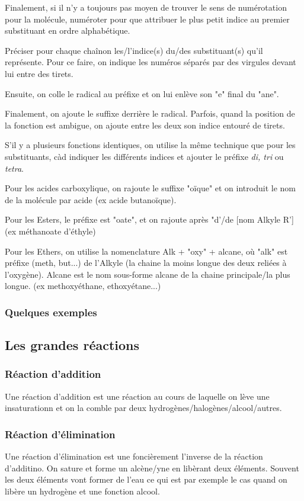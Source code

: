 \documentclass[a4paper]{article}
\begin{document}
    Finalement, si il n'y a toujours pas moyen de trouver le sens de
    numérotation pour la molécule, numéroter pour que attribuer le plus petit
    indice au premier substituant en ordre alphabétique.

    Préciser pour chaque chaînon les/l'indice(s) du/des substituant(s) qu'il
    représente. Pour ce faire, on indique les numéros séparés par des virgules
    devant lui entre des tirets.

    Ensuite, on colle le radical au préfixe et on lui enlève son "e" final du
    "ane".

    Finalement, on ajoute le suffixe derrière le radical. Parfois, quand la
    position de la fonction est ambigue, on ajoute entre les deux son indice
    entouré de tirets.

    S'il y a plusieurs fonctions identiques, on utilise la même technique que
    pour les substituants, càd indiquer les différents indices et ajouter le
    préfixe \textit{di, tri} ou \textit{tetra}.

    Pour les acides carboxylique, on rajoute le suffixe "oïque" et on introduit
    le nom de la molécule par acide (ex acide butanoïque).

    Pour les Esters, le préfixe est "oate", et on rajoute après "d'/de [nom
    Alkyle R'] (ex méthanoate d'éthyle)

    Pour les Ethers, on utilise la nomenclature Alk + "oxy" + alcane, où "alk"
    est préfixe (meth, but...) de l'Alkyle (la chaine la moins longue des deux
    reliées à l'oxygène).  Alcane est le nom sous-forme alcane de la chaine
    principale/la plus longue. (ex methoxyéthane, ethoxyétane...) 

    \subsubsection{Quelques exemples}
    \vspace{2.5in}
    \subsection{Les grandes réactions}
    \subsubsection{Réaction d'addition}
    Une réaction d'addition est une réaction au cours de laquelle on lève une
    insaturationn et on la comble par deux hydrogènes/halogènes/alcool/autres.
    \subsubsection{Réaction d'élimination}
    Une réaction d'élimination est une foncièrement l'inverse de la réaction
    d'additino. On sature et forme un alcène/yne en libèrant deux éléments.
    Souvent les deux éléments vont former de l'eau ce qui est par exemple le cas
    quand on libère un hydrogène et une fonction alcool. 
\end{document}
